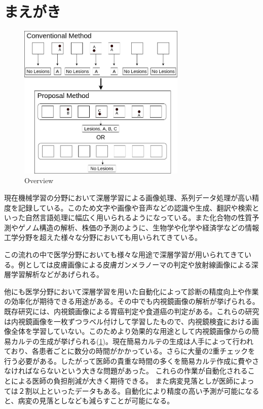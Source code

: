 \section{まえがき}

\begin{figure}[b]
    \begin{center}
        \includegraphics[width=80mm]{./fig/0.png}
        \caption{Overview}
        \label{fig:overview}
    \end{center}
\end{figure}

現在機械学習の分野において深層学習による画像処理\cite{CNN,AlexNet,VGG,ResNet}、系列データ処理\cite{RNN,GRU,LSTM,Transformer}が高い精度を記録している。このため文字や画像や音声などの認識\cite{DL_LVCSR,ImageNet}や生成\cite{GAN,VAE}、翻訳\cite{Transformer,Seq2Seq,effective_attention}や検索\cite{anxious_learning}といった自然言語処理に幅広く用いられるようになっている。また化合物の性質予測\cite{Chemistry1,Chemistry2}やゲノム構造の解析\cite{Genomics}、株価の予測\cite{stock_prediction}のように、生物学や化学や経済学などの情報工学分野を超えた様々な分野においても用いられてきている。

この流れの中で医学分野においても様々な用途で深層学習が用いられてきている。例としては皮膚画像による皮膚ガンメラノーマの判定\cite{skin_cancer_melanoma}や放射線画像による深層学習解析\cite{radiology}などがあげられる。

他にも医学分野において深層学習を用いた自動化によって診断の精度向上や作業の効率化が期待できる用途がある。その中でも内視鏡画像の解析が挙げられる。既存研究には、内視鏡画像による胃癌判定\cite{stomach_cancer}や食道癌\cite{esophageal_cancer}の判定がある。これらの研究は内視鏡画像を一枚ずつラベル付けして学習したもので、内視鏡検査における画像全体を学習していない。このためより効果的な用途として内視鏡画像からの簡易カルテの生成が挙げられる(\ref{fig:overview})。現在簡易カルテの生成は人手によって行われており、各患者ごとに数分の時間がかかっている。さらに大量の2重チェックを行う必要がある。したがって医師の貴重な時間の多くを簡易カルテ作成に費やさなければならないという大きな問題があった。
これらの作業が自動化されることによる医師の負担削減が大きく期待できる。
また病変見落としが医師によっては２割以上といったデータ\cite{medical_problem2}もある。自動化により精度の高い予測が可能になると、病変の見落としなども減らすことが可能になる。

